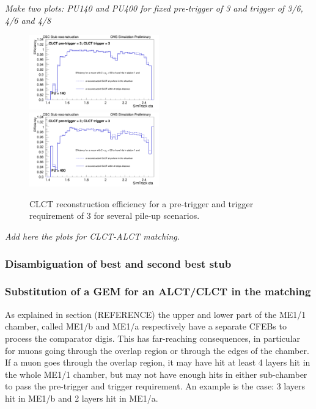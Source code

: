 \textit{Make two plots: PU140 and PU400 for fixed pre-trigger of 3 and trigger of 3/6, 4/6 and 4/8} 

\begin{figure}[htb]
\includegraphics[width=0.5\textwidth]{figures/simTrackToClctMatchingEfficiencyVsEtaME1_pu140_preTrig33.png}
\includegraphics[width=0.5\textwidth]{figures/simTrackToClctMatchingEfficiencyVsEtaME1_pu400_preTrig33.png}
\caption{CLCT reconstruction efficiency for a pre-trigger and trigger requirement of 3 for several pile-up scenarios.}
\label{fig:clct_reconstruction_efficiency_eta_trig_pu}
\end{figure}

\textit{Add here the plots for CLCT-ALCT matching.}

\subsubsection{Disambiguation of best and second best stub}

\subsubsection{Substitution of a GEM for an ALCT/CLCT in the matching}

As explained in section (REFERENCE) the upper and lower part of the ME1/1 chamber, called ME1/b and ME1/a respectively have a separate CFEBs to process the comparator digis. This has far-reaching consequences, in particular for muons going through the overlap region or through the edges of the chamber. If a muon goes through the overlap region, it may have hit at least 4 layers hit in the whole ME1/1 chamber, but may not have enough hits in either sub-chamber to pass the pre-trigger and trigger requirement. An example is the case: 3 layers hit in ME1/b and 2 layers hit in ME1/a. 

